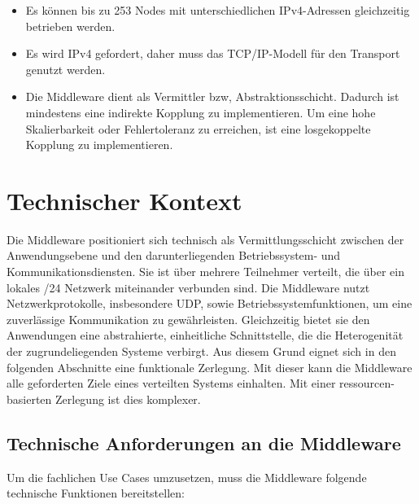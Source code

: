 \begin{itemize}
	\item Es können bis zu 253 Nodes mit unterschiedlichen IPv4-Adressen gleichzeitig betrieben werden.
	\item Es wird IPv4 gefordert, daher muss das TCP/IP-Modell für den Transport genutzt werden. 
	\item Die Middleware dient als Vermittler bzw, Abstraktionsschicht. Dadurch ist mindestens eine indirekte Kopplung zu implementieren. Um eine hohe Skalierbarkeit oder Fehlertoleranz zu erreichen, ist eine losgekoppelte Kopplung zu implementieren.
\end{itemize}

\section{Technischer Kontext}

Die Middleware positioniert sich technisch als Vermittlungsschicht zwischen der Anwendungsebene und den darunterliegenden Betriebssystem- und Kommunikationsdiensten. Sie ist über mehrere Teilnehmer verteilt, die über ein lokales /24 Netzwerk miteinander verbunden sind.
Die Middleware nutzt Netzwerkprotokolle, insbesondere UDP, sowie Betriebssystemfunktionen, um eine zuverlässige Kommunikation zu gewährleisten. Gleichzeitig bietet sie den Anwendungen eine abstrahierte, einheitliche Schnittstelle, die die Heterogenität der zugrundeliegenden Systeme verbirgt. Aus diesem Grund eignet sich in den folgenden Abschnitte eine funktionale Zerlegung. Mit dieser kann die Middleware alle geforderten Ziele eines verteilten Systems einhalten. Mit einer ressourcen-basierten Zerlegung ist dies komplexer.

\subsection{Technische Anforderungen an die Middleware}

Um die fachlichen Use Cases umzusetzen, muss die Middleware folgende technische Funktionen bereitstellen:

